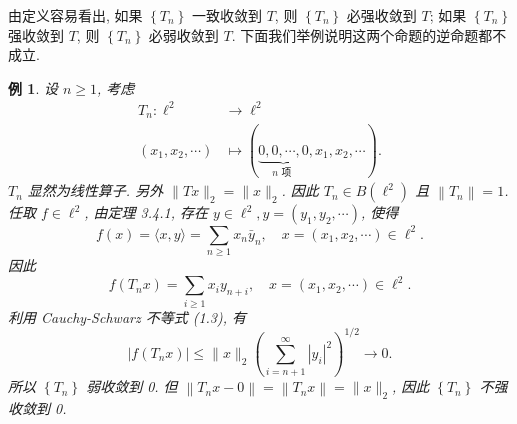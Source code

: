 \documentclass[openany]{ctexbook}
\theoremstyle{kaiti}
\theoremstyle{normal}
\newtheorem{example}{例}[section]
\begin{document}
由定义容易看出, 如果 $\left\{T_n\right\}$ 一致收敛到 $T$, 则 $\left\{T_n\right\}$ 必强收敛到 $T$; 如果 $\left\{T_n\right\}$ 强收敛到 $T$, 则 $\left\{T_n\right\}$ 必弱收敛到 $T$. 下面我们举例说明这两个命题的逆命题都不成立.

\begin{example}
设 $n \geqslant 1$, 考虑
$$
\begin{aligned}
T_n: \ell^2 & \rightarrow \ell^2 \\
\left(x_1, x_2, \cdots\right) & \mapsto(\underbrace{0,0, \cdots, 0}_{n \text { 项 }}, x_1, x_2, \cdots).
\end{aligned}
$$
$T_n$ 显然为线性算子. 另外 $\|T x\|_2=\|x\|_2$. 因此 $T_n \in B\left(\ell^2\right)$ 且 $\left\|T_n\right\|=1$.
任取 $f \in \ell^2$, 由定理 3.4.1, 存在 $y \in \ell^2, y=\left(y_1, y_2, \cdots\right)$, 使得
$$
f(x)=\langle x, y\rangle=\sum_{n \geqslant 1} x_n \bar{y}_n, \quad x=\left(x_1, x_2, \cdots\right) \in \ell^2.
$$
因此
$$
f\left(T_n x\right)=\sum_{i \geqslant 1} x_{i} y_{n+i}, \quad x=\left(x_1, x_2, \cdots\right) \in \ell^2.
$$
利用 Cauchy-Schwarz 不等式 (1.3), 有
$$
\left|f\left(T_n x\right)\right| \leqslant\|x\|_2\left(\sum_{i=n+1}^{\infty}\left|y_{i}\right|^2\right)^{1 / 2} \rightarrow 0.
$$
所以 $\left\{T_n\right\}$ 弱收敛到 0. 但 $\left\|T_n x-0\right\|=\left\|T_n x\right\|=\|x\|_2$, 因此 $\left\{T_n\right\}$ 不强收敛到 0.
\end{example}
\end{document}
